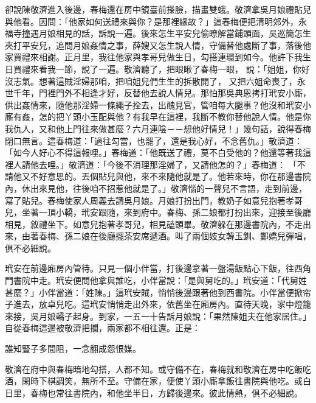 \begin{showcontents}{}
卻說陳敬濟進入後邊，春梅還在房中鏡臺前搽臉，描畫雙蛾。敬濟拿吳月娘禮貼兒與他看。因問：「他家如何送禮來與你？是那裡緣故？」這春梅便把清明郊外，永福寺撞遇月娘相見的話，訴說一遍。後來怎生平安兒偷瞭解當鋪頭面，吳巡簡怎生夾打平安兒，追問月娘姦情之事，薛嫂又怎生說人情，守備替他處斷了事，落後他家買禮來相謝。正月里，我往他家與孝哥兒做生日，勾搭連環到如今。他許下我生日買禮來看我一節，說了一遍。敬濟聽了，把眼瞅了春梅一眼，
說：「姐姐，你好沒志氣。想著這賊淫婦那咱，把咱姐兒們生生的拆散開了，
又把六姐命喪了，永世千年，門裡門外不相逢才好，反替他去說人情兒。那怕那吳典恩拷打玳安小廝，供出姦情來，隨他那淫婦一條繩子拴去，出醜見官，管咱每大腿事？他沒和玳安小廝有姦，怎的把丫頭小玉配與他？有我早在這裡，我斷不教你替他說人情。他是你我仇人，又和他上門往來做甚麼？六月連陰－－想他好情兒！」幾句話，說得春梅閉口無言。這春梅道：「過往勾當，也罷了，還是我心好，不念舊仇。」敬濟道： 「如今人好心不得這報哩。」春梅道：「他既送了禮，莫不白受他的？他還等著我這裡人請他去哩。」敬濟道：「今後不消理那淫婦了，又請他怎的？」春梅道： 「不請他又不好意思的。丟個貼兒與他，來不來隨他就是了。他若來時，你在那邊書院內，休出來見他，往後咱不招惹他就是了。」敬濟惱的一聲兒不言語，走到前邊，寫了貼兒。春梅使家人周義去請吳月娘。月娘打扮出門，教奶子如意兒抱著孝哥兒，坐著一頂小轎，玳安跟隨，來到府中。春梅、孫二娘都打扮出來，迎接至後廳相見，敘禮坐下。如意兒抱著孝哥兒，相見磕頭畢。敬濟躲在那邊書院內，不走出來，由著春梅、孫二娘在後廳擺茶安席遞酒。叫了兩個妓女韓玉釧、鄭嬌兒彈唱，俱不必細說。

玳安在前邊廂房內管待。只見一個小伴當，打後邊拿著一盤湯飯點心下飯，往西角門書院中走。玳安便問他拿與誰吃，小伴當說：「是與舅吃的。」玳安道：「代舅姓甚麼？」小伴當道：「姓陳。」這玳安賊，悄悄後邊跟著他到西書院。小伴當便掀帘子進去，放卓兒吃。這玳安悄悄走出外來，依舊坐在廂房內。直待天晚，家中燈籠來接，吳月娘轎子起身。到家，一五一十告訴月娘說：「果然陳姐夫在他家居住。」自從春梅這邊被敬濟把攔，兩家都不相往還。正是：

誰知豎子多間阻，一念翻成怨恨媒。

敬濟在府中與春梅暗地勾搭，人都不知。或守備不在，春梅就和敬濟在房中吃飯吃酒，閑時下棋調笑，無所不至。守備在家，便使丫頭小廝拿飯往書院與他吃。或白日里，春梅也常往書院內，和他坐半日，方歸後邊來。彼此情熱，俱不必細說。


\end{showcontents}
